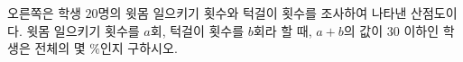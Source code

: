 \noindent\begin{minipage}[t]{0.58\linewidth}\vspace{0pt}\raggedright 오른쪽은 학생 $20$명의 윗몸 일으키기 횟수와 턱걸이 횟수를 조사하여 나타낸 산점도이다. 윗몸 일으키기 횟수를 $a$회, 턱걸이 횟수를 $b$회라 할 때, $a+b$의 값이 $30$ 이하인 학생은 전체의 몇 $\%$인지 구하시오.\end{minipage}\hfill\begin{minipage}[t]{0.4\linewidth}\vspace{0pt}\centering \resizebox{\ifdim\width>\linewidth\linewidth\else\width\fi}{!}{}\end{minipage}\par
